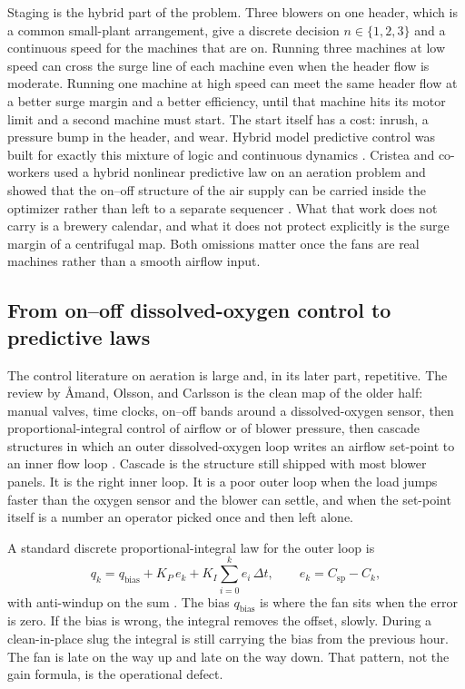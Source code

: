 Staging is the hybrid part of the problem. Three blowers on one header, which is a common small-plant arrangement, give a discrete decision $n\in\{1,2,3\}$ and a continuous speed for the machines that are on. Running three machines at low speed can cross the surge line of each machine even when the header flow is moderate. Running one machine at high speed can meet the same header flow at a better surge margin and a better efficiency, until that machine hits its motor limit and a second machine must start. The start itself has a cost: inrush, a pressure bump in the header, and wear. Hybrid model predictive control was built for exactly this mixture of logic and continuous dynamics \cite{bemporad1999hybrid}. Cristea and co-workers used a hybrid nonlinear predictive law on an aeration problem and showed that the on--off structure of the air supply can be carried inside the optimizer rather than left to a separate sequencer \cite{cristea2011}. What that work does not carry is a brewery calendar, and what it does not protect explicitly is the surge margin of a centrifugal map. Both omissions matter once the fans are real machines rather than a smooth airflow input.

\subsection{From on--off dissolved-oxygen control to predictive laws}

The control literature on aeration is large and, in its later part, repetitive. The review by {\AA}mand, Olsson, and Carlsson is the clean map of the older half: manual valves, time clocks, on--off bands around a dissolved-oxygen sensor, then proportional-integral control of airflow or of blower pressure, then cascade structures in which an outer dissolved-oxygen loop writes an airflow set-point to an inner flow loop \cite{amand2013review,olsson2012ica,olsson2005ica}. Cascade is the structure still shipped with most blower panels. It is the right inner loop. It is a poor outer loop when the load jumps faster than the oxygen sensor and the blower can settle, and when the set-point itself is a number an operator picked once and then left alone.

A standard discrete proportional-integral law for the outer loop is
\begin{equation}
\label{eq:pi}
q_{k}
=
q_{\mathrm{bias}}
+
K_{P}\,e_{k}
+
K_{I}\sum_{i=0}^{k} e_{i}\,\Delta t,
\qquad
e_{k}
=
C_{\mathrm{sp}}-C_{k},
\end{equation}
with anti-windup on the sum \cite{astrom2006pid,skogestad2003pid,seborg2016}. The bias $q_{\mathrm{bias}}$ is where the fan sits when the error is zero. If the bias is wrong, the integral removes the offset, slowly. During a clean-in-place slug the integral is still carrying the bias from the previous hour. The fan is late on the way up and late on the way down. That pattern, not the gain formula, is the operational defect.

